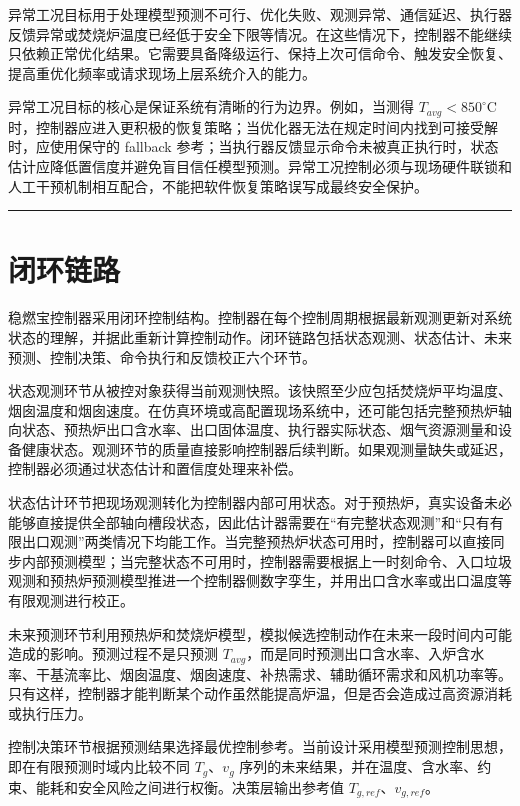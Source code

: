 \documentclass[UTF8,openany,zihao=-4,oneside]{ctexbook}
\newcommand{\manualdivider}{\par\vspace{0.6em}\noindent\textcolor{FGLine}{\rule{\linewidth}{0.7pt}}\vspace{0.6em}\par}
\begin{document}
异常工况目标用于处理模型预测不可行、优化失败、观测异常、通信延迟、执行器反馈异常或焚烧炉温度已经低于安全下限等情况。在这些情况下，控制器不能继续只依赖正常优化结果。它需要具备降级运行、保持上次可信命令、触发安全恢复、提高重优化频率或请求现场上层系统介入的能力。

异常工况目标的核心是保证系统有清晰的行为边界。例如，当测得 \(T_{avg}<850^\circ\mathrm{C}\) 时，控制器应进入更积极的恢复策略；当优化器无法在规定时间内找到可接受解时，应使用保守的 fallback 参考；当执行器反馈显示命令未被真正执行时，状态估计应降低置信度并避免盲目信任模型预测。异常工况控制必须与现场硬件联锁和人工干预机制相互配合，不能把软件恢复策略误写成最终安全保护。

\manualdivider

\section{闭环链路}\label{sec:closed-loop}

稳燃宝控制器采用闭环控制结构。控制器在每个控制周期根据最新观测更新对系统状态的理解，并据此重新计算控制动作。闭环链路包括状态观测、状态估计、未来预测、控制决策、命令执行和反馈校正六个环节。

状态观测环节从被控对象获得当前观测快照。该快照至少应包括焚烧炉平均温度、烟囱温度和烟囱速度。在仿真环境或高配置现场系统中，还可能包括完整预热炉轴向状态、预热炉出口含水率、出口固体温度、执行器实际状态、烟气资源测量和设备健康状态。观测环节的质量直接影响控制器后续判断。如果观测量缺失或延迟，控制器必须通过状态估计和置信度处理来补偿。

状态估计环节把现场观测转化为控制器内部可用状态。对于预热炉，真实设备未必能够直接提供全部轴向槽段状态，因此估计器需要在“有完整状态观测”和“只有有限出口观测”两类情况下均能工作。当完整预热炉状态可用时，控制器可以直接同步内部预测模型；当完整状态不可用时，控制器需要根据上一时刻命令、入口垃圾观测和预热炉预测模型推进一个控制器侧数字孪生，并用出口含水率或出口温度等有限观测进行校正。

未来预测环节利用预热炉和焚烧炉模型，模拟候选控制动作在未来一段时间内可能造成的影响。预测过程不是只预测 \(T_{avg}\)，而是同时预测出口含水率、入炉含水率、干基流率比、烟囱温度、烟囱速度、补热需求、辅助循环需求和风机功率等。只有这样，控制器才能判断某个动作虽然能提高炉温，但是否会造成过高资源消耗或执行压力。

控制决策环节根据预测结果选择最优控制参考。当前设计采用模型预测控制思想，即在有限预测时域内比较不同 \(T_g\)、\(v_g\) 序列的未来结果，并在温度、含水率、约束、能耗和安全风险之间进行权衡。决策层输出参考值 \(T_{g,ref}\)、\(v_{g,ref}\)。
\end{document}
